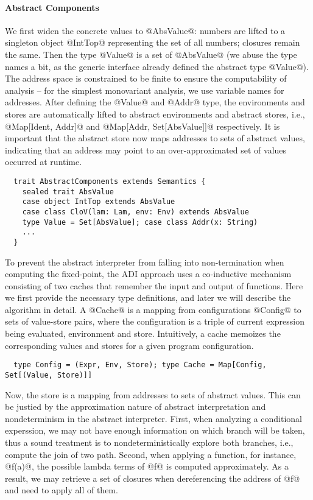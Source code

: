 \paragraph{Abstract Components}

We first widen the concrete values to @AbsValue@: numbers are lifted to a
singleton object @IntTop@ representing the set of all numbers; closures remain
the same. Then the type @Value@ is a set of @AbsValue@ (we abuse the type names
a bit, as the generic interface already defined the abstract type @Value@).
The address space is constrained to be finite to ensure the computability of
analysis -- for the simplest monovariant analysis, we use variable names for
addresses. After defining the @Value@ and @Addr@ type, the environments and
stores are automatically lifted to abstract environments and abstract stores,
i.e., @Map[Ident, Addr]@ and @Map[Addr, Set[AbsValue]]@ respectively.
It is important that the abstract store now maps addresses to sets of abstract
values, indicating that an address may point to an over-approximated set of
values occurred at runtime.

\begin{lstlisting}
  trait AbstractComponents extends Semantics {
    sealed trait AbsValue
    case object IntTop extends AbsValue
    case class CloV(lam: Lam, env: Env) extends AbsValue
    type Value = Set[AbsValue]; case class Addr(x: String)
    ...
  }
\end{lstlisting}

To prevent the abstract interpreter from falling into non-termination when
computing the fixed-point, the ADI approach uses a co-inductive mechanism
consisting of two caches that remember the input and output of functions.
Here we first provide the necessary type definitions, and later we will describe
the algorithm in detail. A @Cache@ is a mapping from configurations @Config@ to
sets of value-store pairs, where the configuration is a triple of current
expression being evaluated, environment and store. Intuitively, a cache memoizes
the corresponding values and stores for a given program configuration.

\begin{lstlisting}
  type Config = (Expr, Env, Store); type Cache = Map[Config, Set[(Value, Store)]]
\end{lstlisting}

Now, the store is a mapping from addresses to sets of abstract values. This can
be justied by the approximation nature of abstract interpretation and
nondeterminism in the abstract interpreter.
First, when analyzing a conditional experssion, we may not have enough
information on which branch will be taken, thus a sound treatment is to
nondeterministically explore both branches, i.e., compute the join of two path.
Second, when applying a function, for instance, @f(a)@, the possible lambda
terms of @f@ is computed approximately. As a result, we may retrieve a set of
closures when dereferencing the address of @f@ and need to apply all of them.

